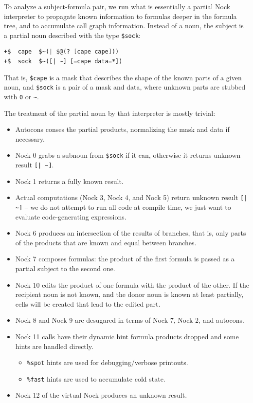 \documentclass[twoside]{article}
\begin{document}
To analyze a subject-formula pair, we run what is essentially a partial Nock interpreter to propagate known information to formulas deeper in the formula tree, and to accumulate call graph information.  Instead of a noun, the subject
is a partial noun described with the type \lstinline[style=inlinecode]{$sock}:

\begin{lstlisting}[style=listingblock]
+$  cape  $~(| $@(? [cape cape]))
+$  sock  $~([| ~] [=cape data=*])
\end{lstlisting}

That is, \lstinline[style=inlinecode]{$cape} is a mask that describes the shape of the known parts of a given
noun, and \lstinline[style=inlinecode]{$sock} is a pair of a mask and data, where unknown parts are stubbed
with \lstinline[style=inlinecode]{0} or \lstinline[style=inlinecode]{~}.

The treatment of the partial noun by that interpreter is mostly trivial:

\begin{itemize}
\item  Autocons conses the partial products, normalizing the mask and data if necessary.
\item  Nock 0 grabs a subnoun from \lstinline[style=inlinecode]{$sock} if it can, otherwise it returns unknown result \lstinline[style=inlinecode]{[| ~]}.
\item  Nock 1 returns a fully known result.
\item  Actual computations (Nock 3, Nock 4, and Nock 5) return unknown result \lstinline[style=inlinecode]{[| ~]} -- we do not attempt to run all code at compile time, we just want to evaluate code-generating expressions.
\item  Nock 6 produces an intersection of the results of branches, that is, only parts of the products that are known and equal between branches.
\item  Nock 7 composes formulas: the product of the first formula is passed as a partial subject to the second one.
\item  Nock 10 edits the product of one formula with the product of the other.  If the recipient noun is not known, and the donor noun is known at least partially, cells will be created that lead to the edited part.
\item  Nock 8 and Nock 9 are desugared in terms of Nock 7, Nock 2, and autocons.
\item Nock 11 calls have their dynamic hint formula products dropped and some hints are handled directly.
  \begin{itemize}
  \item  \lstinline[style=inlinecode]{%spot} hints are used for debugging/verbose printouts.
  \item  \lstinline[style=inlinecode]{%fast} hints are used to accumulate cold state.
  \end{itemize}
\item Nock 12 of the virtual Nock produces an unknown result.
\end{itemize}
\end{document}
